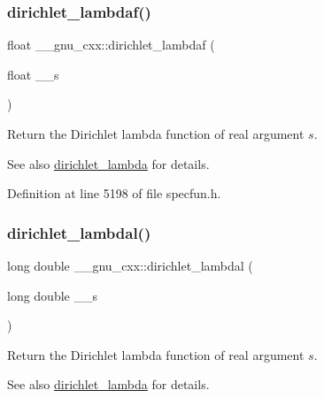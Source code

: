 \subsubsection{\texorpdfstring{dirichlet\+\_\+lambdaf()}{dirichlet\_lambdaf()}}
{\footnotesize\ttfamily float \+\_\+\+\_\+gnu\+\_\+cxx\+::dirichlet\+\_\+lambdaf (\begin{DoxyParamCaption}\item[{float}]{\+\_\+\+\_\+s }\end{DoxyParamCaption})\hspace{0.3cm}{\ttfamily [inline]}}

Return the Dirichlet lambda function of real argument $ s $.

\begin{DoxySeeAlso}{See also}
\hyperlink{group__gnu__math__spec__func_ga06842a81bdcabf9c62252dde992d42ee}{dirichlet\+\_\+lambda} for details. 
\end{DoxySeeAlso}


Definition at line 5198 of file specfun.\+h.

\mbox{\label{group__gnu__math__spec__func_gab28d06c4e3c7457f1fa3663168678fb2}} 
\subsubsection{\texorpdfstring{dirichlet\+\_\+lambdal()}{dirichlet\_lambdal()}}
{\footnotesize\ttfamily long double \+\_\+\+\_\+gnu\+\_\+cxx\+::dirichlet\+\_\+lambdal (\begin{DoxyParamCaption}\item[{long double}]{\+\_\+\+\_\+s }\end{DoxyParamCaption})\hspace{0.3cm}{\ttfamily [inline]}}

Return the Dirichlet lambda function of real argument $ s $.

\begin{DoxySeeAlso}{See also}
\hyperlink{group__gnu__math__spec__func_ga06842a81bdcabf9c62252dde992d42ee}{dirichlet\+\_\+lambda} for details. 
\end{DoxySeeAlso}


